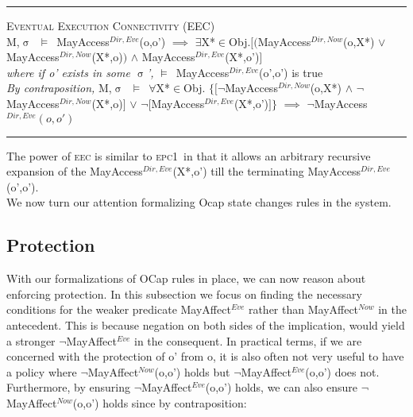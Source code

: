 \documentclass[a4paper,11pt, twoside,twocolumn]{article}
\newenvironment{logic}[1][]
{\begin{flushleft} \small }
{\end{flushleft}}
\newcommand{\loin}{$\in$}
\newcommand{\loforall}{$\forall$}
\newcommand{\loexists}{$\exists$}
\newcommand{\loand}{$\land$}
\newcommand{\loor} {$\lor$}
\newcommand{\loimplies}{$\implies$}
\newcommand{\losigma}{$\upsigma$}
\newcommand{\loturns} {$\vDash$}
\newcommand{\loneg}{$\boldsymbol \neg$}
\newcommand{\ablock} {\null\qquad}
\begin{document}
\begin{logic}
\hrule\null
\textsc{\normalsize *Eventual Execution Connectivity (EEC)}\\
M,\losigma\ \loturns\ MayAccess$^{Dir,Eve}$(o,o')\linebreak
\ablock \loimplies\linebreak
\ablock \loexists X*\loin Obj.$[($MayAccess$^{Dir,Now}$(o,X*) \loor \linebreak
\ablock \ablock \ablock \ablock MayAccess$^{Dir,Now}$(X*,o)$)$\linebreak
\ablock \ablock \ablock \ablock \loand \linebreak
\ablock \ablock \ablock \ablock MayAccess$^{Dir,Eve}$(X*,o')$]$
\\
\ablock \textit{where if o' exists in some \losigma',}\linebreak
\ablock \loturns\ MayAccess$^{Dir,Eve}$(o',o') is true\linebreak
\\
\textit{By contraposition,}\linebreak
M,\losigma\ \loturns\ 
\loforall X*\loin Obj. $\{[$\loneg MayAccess$^{Dir,Now}$(o,X*) \loand \linebreak
\ablock \ablock \ablock \ablock \quad \loneg MayAccess$^{Dir,Now}$(X*,o)$]$\linebreak
\ablock \ablock \ablock \ablock \loor \linebreak
\ablock \ablock \ablock \ablock \loneg $[$MayAccess$^{Dir,Eve}$(X*,o')$]\}$\linebreak
\ablock \loimplies\linebreak
	\ablock\loneg MayAccess$^{Dir,Eve}(o,o')$\linebreak
\hrule
\end{logic}
The power of \textsc{eec} is similar to \textsc{epc1}\ in that it allows an arbitrary recursive expansion of the MayAccess$^{Dir,Eve}$(X*,o') till the terminating MayAccess$^{Dir,Eve}$(o',o').\\

We now turn our attention formalizing Ocap state changes rules in the system.\\

\subsection{Protection}\label{protection}
With our formalizations of OCap rules in place, we can now reason about enforcing protection. In this subsection we focus on finding the necessary conditions for the weaker predicate MayAffect$^{Eve}$ rather than MayAffect$^{Now}$ in the antecedent. This is because negation on both sides of the implication, would yield a stronger \loneg MayAffect$^{Eve}$ in the consequent. In practical terms, if we are concerned with the protection of o' from o, it is also often not very useful to have a policy where \loneg MayAffect$^{Now}$(o,o') holds but \loneg MayAffect$^{Eve}$(o,o') does not. Furthermore, by ensuring \loneg MayAffect$^{Eve}$(o,o') holds, we can also ensure \loneg MayAffect$^{Now}$(o,o') holds since by contraposition:
\end{document}
